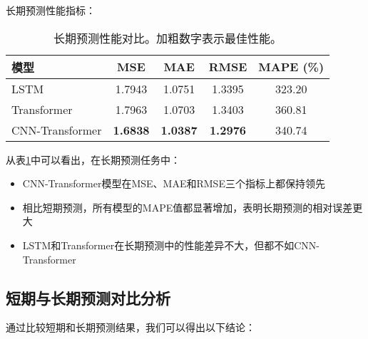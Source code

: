 \documentclass[a4paper,11pt]{article}
\begin{document}
长期预测性能指标：
\begin{table}[htbp]
\centering
\begin{tabular}{lcccc}
\toprule
模型 & MSE & MAE & RMSE & MAPE (\%) \\
\midrule
LSTM & 1.7943 & 1.0751 & 1.3395 & 323.20 \\
Transformer & 1.7963 & 1.0703 & 1.3403 & 360.81 \\
CNN-Transformer & \textbf{1.6838} & \textbf{1.0387} & \textbf{1.2976} & 340.74 \\
\bottomrule
\end{tabular}
\caption{长期预测性能对比。加粗数字表示最佳性能。}
\label{tab:long_term}
\end{table}

从表\ref{tab:long_term}中可以看出，在长期预测任务中：
\begin{itemize}
    \item CNN-Transformer模型在MSE、MAE和RMSE三个指标上都保持领先
    \item 相比短期预测，所有模型的MAPE值都显著增加，表明长期预测的相对误差更大
    \item LSTM和Transformer在长期预测中的性能差异不大，但都不如CNN-Transformer
\end{itemize}

\subsection{短期与长期预测对比分析}
通过比较短期和长期预测结果，我们可以得出以下结论：
\end{document}
